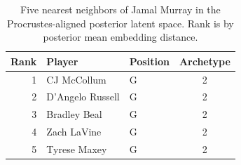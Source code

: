 \begin{table}[htbp]
  \centering\small
  \begin{tabular}{rllc}
    \toprule
    Rank & Player & Position & Archetype \\
    \midrule
    1 & CJ McCollum & G & 2 \\
    2 & D'Angelo Russell & G & 2 \\
    3 & Bradley Beal & G & 2 \\
    4 & Zach LaVine & G & 2 \\
    5 & Tyrese Maxey & G & 2 \\
    \bottomrule
  \end{tabular}
  \caption{Five nearest neighbors of Jamal Murray in the Procrustes-aligned posterior latent space. Rank is by posterior mean embedding distance.}
\end{table}

